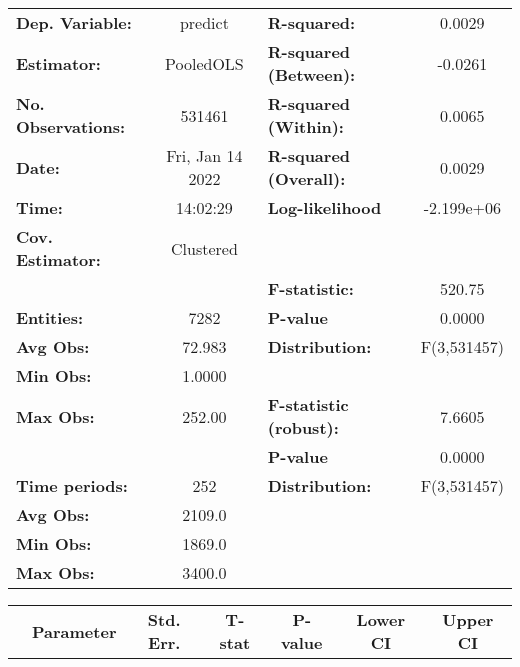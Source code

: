 \begin{center}
\begin{tabular}{lclc}
\toprule
\textbf{Dep. Variable:}    &      predict       & \textbf{  R-squared:         }   &      0.0029      \\
\textbf{Estimator:}        &     PooledOLS      & \textbf{  R-squared (Between):}  &     -0.0261      \\
\textbf{No. Observations:} &       531461       & \textbf{  R-squared (Within):}   &      0.0065      \\
\textbf{Date:}             &  Fri, Jan 14 2022  & \textbf{  R-squared (Overall):}  &      0.0029      \\
\textbf{Time:}             &      14:02:29      & \textbf{  Log-likelihood     }   &    -2.199e+06    \\
\textbf{Cov. Estimator:}   &     Clustered      & \textbf{                     }   &                  \\
\textbf{}                  &                    & \textbf{  F-statistic:       }   &      520.75      \\
\textbf{Entities:}         &        7282        & \textbf{  P-value            }   &      0.0000      \\
\textbf{Avg Obs:}          &       72.983       & \textbf{  Distribution:      }   &   F(3,531457)    \\
\textbf{Min Obs:}          &       1.0000       & \textbf{                     }   &                  \\
\textbf{Max Obs:}          &       252.00       & \textbf{  F-statistic (robust):} &      7.6605      \\
\textbf{}                  &                    & \textbf{  P-value            }   &      0.0000      \\
\textbf{Time periods:}     &        252         & \textbf{  Distribution:      }   &   F(3,531457)    \\
\textbf{Avg Obs:}          &       2109.0       & \textbf{                     }   &                  \\
\textbf{Min Obs:}          &       1869.0       & \textbf{                     }   &                  \\
\textbf{Max Obs:}          &       3400.0       & \textbf{                     }   &                  \\
\bottomrule
\end{tabular}
\begin{tabular}{lcccccc}
                & \textbf{Parameter} & \textbf{Std. Err.} & \textbf{T-stat} & \textbf{P-value} & \textbf{Lower CI} & \textbf{Upper CI}  \\

\end{tabular}
\end{center}
